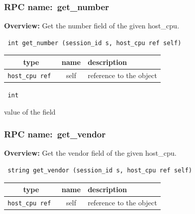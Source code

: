 \subsubsection{RPC name:~get\_number}

{\bf Overview:} 
Get the number field of the given host\_cpu.

\begin{verbatim} int get_number (session_id s, host_cpu ref self)\end{verbatim}



 
\vspace{0.3cm}
\begin{tabular}{|c|c|p{7cm}|}
 \hline
{\bf type} & {\bf name} & {\bf description} \\ \hline
{\tt host\_cpu ref } & self & reference to the object \\ \hline 

\end{tabular}

\vspace{0.3cm}

{\tt 
int
}


value of the field
\vspace{0.3cm}
\vspace{0.3cm}
\vspace{0.3cm}
\subsubsection{RPC name:~get\_vendor}

{\bf Overview:} 
Get the vendor field of the given host\_cpu.

\begin{verbatim} string get_vendor (session_id s, host_cpu ref self)\end{verbatim}



 
\vspace{0.3cm}
\begin{tabular}{|c|c|p{7cm}|}
 \hline
{\bf type} & {\bf name} & {\bf description} \\ \hline
{\tt host\_cpu ref } & self & reference to the object \\ \hline 

\end{tabular}

\vspace{0.3cm}

